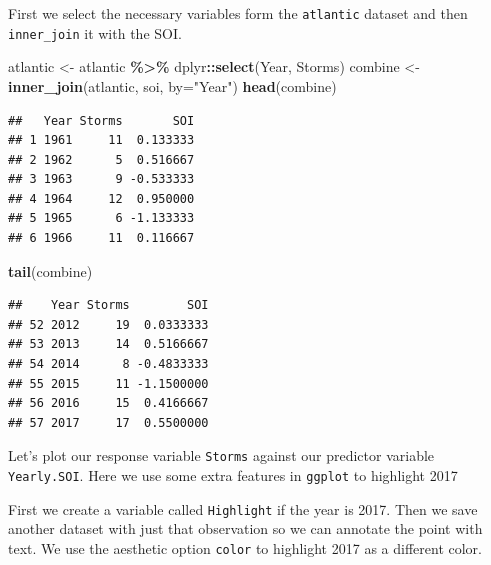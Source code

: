 \documentclass[
]{book}
\newenvironment{Shaded}{\begin{snugshade}}{\end{snugshade}}
\newcommand{\AttributeTok}[1]{\textcolor[rgb]{0.13,0.29,0.53}{#1}}
\newcommand{\FunctionTok}[1]{\textcolor[rgb]{0.13,0.29,0.53}{\textbf{#1}}}
\newcommand{\NormalTok}[1]{#1}
\newcommand{\OtherTok}[1]{\textcolor[rgb]{0.56,0.35,0.01}{#1}}
\newcommand{\SpecialCharTok}[1]{\textcolor[rgb]{0.81,0.36,0.00}{\textbf{#1}}}
\newcommand{\StringTok}[1]{\textcolor[rgb]{0.31,0.60,0.02}{#1}}
\begin{document}
First we select the necessary variables form the \texttt{atlantic} dataset and then \texttt{inner\_join} it with the SOI.

\begin{Shaded}
\begin{Highlighting}[]
\NormalTok{atlantic }\OtherTok{\textless{}{-}}\NormalTok{ atlantic }\SpecialCharTok{\%\textgreater{}\%}
\NormalTok{  dplyr}\SpecialCharTok{::}\FunctionTok{select}\NormalTok{(Year, Storms)}
\NormalTok{combine }\OtherTok{\textless{}{-}} \FunctionTok{inner\_join}\NormalTok{(atlantic, soi, }\AttributeTok{by=}\StringTok{"Year"}\NormalTok{)}
\FunctionTok{head}\NormalTok{(combine)}
\end{Highlighting}
\end{Shaded}

\begin{verbatim}
##   Year Storms       SOI
## 1 1961     11  0.133333
## 2 1962      5  0.516667
## 3 1963      9 -0.533333
## 4 1964     12  0.950000
## 5 1965      6 -1.133333
## 6 1966     11  0.116667
\end{verbatim}

\begin{Shaded}
\begin{Highlighting}[]
\FunctionTok{tail}\NormalTok{(combine)}
\end{Highlighting}
\end{Shaded}

\begin{verbatim}
##    Year Storms        SOI
## 52 2012     19  0.0333333
## 53 2013     14  0.5166667
## 54 2014      8 -0.4833333
## 55 2015     11 -1.1500000
## 56 2016     15  0.4166667
## 57 2017     17  0.5500000
\end{verbatim}

Let's plot our response variable \texttt{Storms} against our predictor variable \texttt{Yearly.SOI}. Here we use some extra features in \texttt{ggplot} to highlight 2017

First we create a variable called \texttt{Highlight} if the year is 2017. Then we save another dataset with just that observation so we can annotate the point with text. We use the aesthetic option \texttt{color} to highlight 2017 as a different color.
\end{document}
